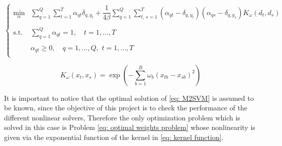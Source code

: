 \documentclass[a4paper,12pt]{article}
\newcommand{\myreferences}{C:/Users/Asun/Github/Bibliography/Bibliography_all}
\begin{document}
\begin{equation}\label{eq: M2SVM}
  \left\{
  \begin{array}{cl}
    \min\limits_{\alpha}& \sum\limits_{q = 1}^Q\sum\limits_{t = 1}^T \alpha_{qt}\delta_{q, y_{t}} + \dfrac{1}{4\beta}\sum\limits_{q = 1}^Q\sum\limits_{t,\, s = 1}^T (\alpha_{qt} - \delta_{q, y_{t}})(\alpha_{qs}-\delta_{q,y_{s}})K_{\omega}(d_t, d_s)\\
    \\
    \text{s.t. }  & \sum\limits_{q = 1}^Q \alpha_{qt} = 1,\quad t = 1, \ldots, T\\
    \\
    & \alpha_{qt}\geq 0, \quad q = 1, \ldots, Q, \,\, t = 1, \ldots, T\\
  \end{array}
  \right.
  \end{equation}
  
  \begin{equation}\label{eq: kernel function}
      K_{\omega}(x_t, x_s) = \exp\left(-\sum\limits_{b = 1}^B \omega_b (x_{tb} - x_{sb})^2\right)
  \end{equation}


It is important to notice that the optimal solution of \eqref{eq: M2SVM} is assumed to be known, since the objective of this project is to check the performance of the different nonlinear solvers, Therefore the only optimization problem which is solved in this case is Problem \eqref{eq: optimal weights problem}  whose nonlinearity is given via the exponential function of the kernel in \eqref{eq: kernel function}.




%
\end{document}
